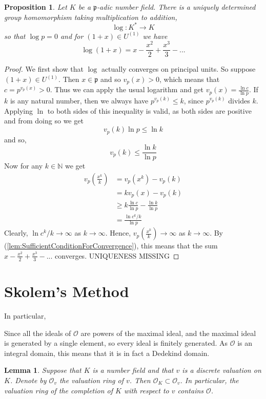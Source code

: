 \documentclass{article}
\newtheorem{proposition}{Proposition}[section]
\newtheorem{lemma}{Lemma}[section]
\newcommand{\mfrak}[1]{\mathfrak{#1}}
\newcommand{\mcal}[1]{\mathcal{#1}}
\newcommand{\mbb}[1]{\mathbb{#1}}
\begin{document}
\begin{proposition}
    Let $K$ be a $\mfrak{p}$-adic number field. There is a uniquely determined group homomorphism taking multiplication to addition,
    $$\log : K^* \to K$$
    so that $\log p = 0$ and for $(1 + x) \in U^{(1)}$ we have
    $$\log (1 + x) = x - \frac{x^2}{2} + \frac{x^3}{3} - ...$$    
\end{proposition}
\begin{proof}
    We first show that $\log$ actually converges on principal units. So suppose $(1 + x) \in U^(1)$. Then $x \in \mfrak p$ and so $v_p(x) > 0$, which means that $c = p^{v_p(x)} > 0$. Thus we can apply the usual logarithm and get $v_p(x) = \frac{\ln c}{\ln p}$. If $k$ is any natural number, then we always have $p^{v_p(k)} \leq k$, since $p^{v_p(k)}$ divides $k$. Applying $\ln$ to both sides of this inequality is valid, as both sides are positive and from doing so we get 
    $$v_p(k) \ln p \leq \ln k$$
    and so,
    $$v_p(k) \leq \frac{\ln k}{\ln p}$$
    Now for any $k \in \mbb N$ we get
    \begin{align*}
        v_p(\frac{x^k}{k}) &= v_p(x^k) - v_p(k)  \\
        &= kv_p(x) - v_p(k) \\
        &\geq k \frac{\ln c}{\ln p} - \frac{\ln k}{\ln p} \\
        &= \frac{\ln c^k / k}{\ln p}
    \end{align*}
    Clearly, $\ln c^k / k \to \infty$ as $k \to \infty$. Hence, $v_p(\frac{x^k}{k}) \to \infty$ as $k \to \infty$. By (\ref{lem:SufficientConditionForConvergence}), this means that the sum $x - \frac{x^2}{2} + \frac{x^3}{3} - ...$ converges. UNIQUENESS MISSING
\end{proof}



\section{Skolem's Method}

In particular, 







Since all the ideals of $\mcal O$ are powers of the maximal ideal, and the maximal ideal is generated by a single element, so every ideal is finitely generated. As $\mcal O$ is an integral domain, this means that it is in fact a Dedekind domain. 

\begin{lemma}
    Suppose that $K$ is a number field and that $v$ is a discrete valuation on $K$. Denote by $\mcal O_v$ the valuation ring of $v$. Then $\mcal O_K \subset \mcal O_v$. In particular, the valuation ring of the completion of $K$ with respect to $v$ contains $\mcal O$.
\end{lemma}
\end{document}
